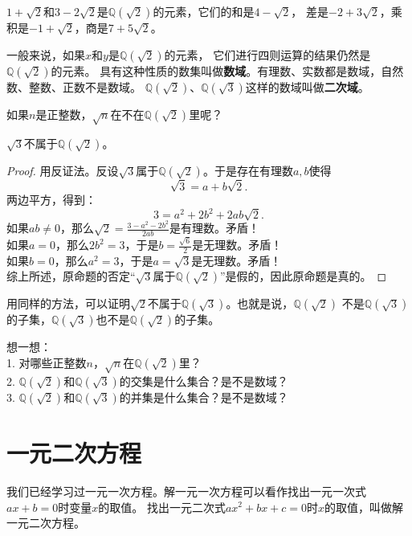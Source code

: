 \documentclass[12pt,UTF8]{ctexbook}
\begin{document}
$1 + \sqrt{2}$和$3 - 2\sqrt{2}$是$\mathbb{Q}(\sqrt{2})$的元素，它们的和是$4 - \sqrt{2}$，
差是$-2 + 3\sqrt{2}$，乘积是$-1 + \sqrt{2}$，商是$7 + 5\sqrt{2}$。

一般来说，如果$x$和$y$是$\mathbb{Q}(\sqrt{2})$的元素，
它们进行四则运算的结果仍然是$\mathbb{Q}(\sqrt{2})$的元素。
具有这种性质的数集叫做\textbf{数域}。有理数、实数都是数域，自然数、整数、正数不是数域。
$\mathbb{Q}(\sqrt{2})$、$\mathbb{Q}(\sqrt{3})$这样的数域叫做\textbf{二次域}。

如果$n$是正整数，$\sqrt{n}$在不在$\mathbb{Q}(\sqrt{2})$里呢？
\begin{tm}
    $\sqrt{3}$不属于$\mathbb{Q}(\sqrt{2})$。
\end{tm}\label{tm:3-1-0}
\begin{proof}
    用反证法。反设$\sqrt{3}$属于$\mathbb{Q}(\sqrt{2})$。于是存在有理数$a,b$使得
    $$ \sqrt{3} = a + b\sqrt{2}.$$
    两边平方，得到：
    $$ 3 = a^2 + 2b^2 + 2ab\sqrt{2}.$$
    如果$ab \neq 0$，那么$ \sqrt{2} = \frac{3 - a^2 - 2b^2}{2ab}$是有理数。矛盾！\\
    如果$a = 0$，那么$2b^2 = 3$，于是$b = \frac{\sqrt{6}}{2}$是无理数。矛盾！\\
    如果$b = 0$，那么$a^2 = 3$，于是$a = \sqrt{3}$是无理数。矛盾！\\
    综上所述，原命题的否定“$\sqrt{3}$属于$\mathbb{Q}(\sqrt{2})$”是假的，因此原命题是真的。
\end{proof}

用同样的方法，可以证明$\sqrt{2}$不属于$\mathbb{Q}(\sqrt{3})$。也就是说，$\mathbb{Q}(\sqrt{2})$
不是$\mathbb{Q}(\sqrt{3})$的子集，$\mathbb{Q}(\sqrt{3})$也不是$\mathbb{Q}(\sqrt{2})$的子集。

\begin{xt}\label{xt:3-1-0}
    想一想：\\
    1. 对哪些正整数$n$，$\sqrt{n}$在$\mathbb{Q}(\sqrt{2})$里？\\
    2. $\mathbb{Q}(\sqrt{2})$和$\mathbb{Q}(\sqrt{3})$的交集是什么集合？是不是数域？\\
    3. $\mathbb{Q}(\sqrt{2})$和$\mathbb{Q}(\sqrt{3})$的并集是什么集合？是不是数域？
\end{xt}


\chapter{一元二次方程}
我们已经学习过一元一次方程。解一元一次方程可以看作找出一元一次式$ax + b = 0$时变量$x$的取值。
找出一元二次式$ax^2 + bx + c = 0$时$x$的取值，叫做解一元二次方程。
\end{document}
